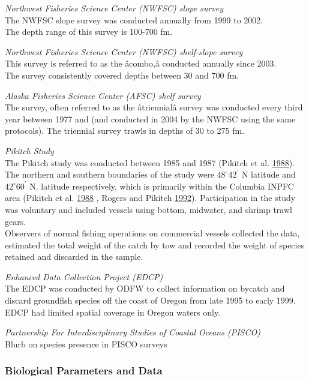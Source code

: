 \documentclass[12pt,]{article}
\begin{document}
\emph{Northwest Fisheries Science Center (NWFSC) slope survey}\\
The NWFSC slope survey was conducted annually from 1999 to 2002.\\
The depth range of this survey is 100-700 fm.

\emph{Northwest Fisheries Science Center (NWFSC) shelf-slope survey}\\
This survey is referred to as the âcombo,â conducted annually since
2003.\\
The survey consistently covered depths between 30 and 700 fm.

\emph{Alaska Fisheries Science Center (AFSC) shelf survey}\\
The survey, often referred to as the âtriennialâ survey was
conducted every third year between 1977 and (and conducted in 2004 by
the NWFSC using the same protocols). The triennial survey trawls in
depths of 30 to 275 fm.

\emph{Pikitch Study}\\
The Pikitch study was conducted between 1985 and 1987 (Pikitch et al.
\protect\hyperlink{ref-Pikitch1988}{1988}). The northern and southern
boundaries of the study were \(48^\circ 42^\prime\) N latitude and
\(42^\circ 60^\prime\) N. latitude respectively, which is primarily
within the Columbia INPFC area (Pikitch et al.
\protect\hyperlink{ref-Pikitch1988}{1988} , Rogers and Pikitch
\protect\hyperlink{ref-Rogers1992}{1992}). Participation in the study
was voluntary and included vessels using bottom, midwater, and shrimp
trawl gears.\\
Observers of normal fishing operations on commercial vessels collected
the data, estimated the total weight of the catch by tow and recorded
the weight of species retained and discarded in the sample.

\emph{Enhanced Data Collection Project (EDCP)}\\
The EDCP was conducted by ODFW to collect information on bycatch and
discard groundfish species off the coast of Oregon from late 1995 to
early 1999.\\
EDCP had limited spatial coverage in Oregon waters only.

\emph{Partnership For Interdisciplinary Studies of Coastal Oceans
(PISCO)}\\
Blurb on species presence in PISCO surveys

\subsubsection{Biological Parameters and
Data}\label{biological-parameters-and-data}
\end{document}
